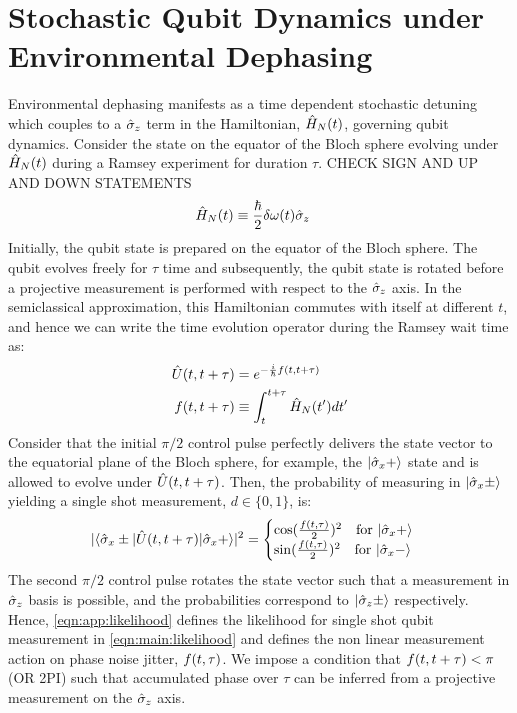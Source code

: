 \section{Stochastic Qubit Dynamics under Environmental Dephasing \label{sec:app:setup}}
Environmental dephasing manifests as a time dependent stochastic detuning which couples to a $\hat{\sigma}_{z}$ term in the Hamiltonian, $\hat{H}_{N} (t)$, governing qubit dynamics. Consider the state on the equator of the Bloch sphere evolving under $\hat{H}_{N} (t)$ during a Ramsey experiment for duration $\tau$. CHECK SIGN AND UP AND DOWN STATEMENTS
\begin{align} 
\hat{H}_{N}(t) & \equiv \frac{\hbar}{2}\delta\omega(t)\hat{\sigma}_{z}
\end{align}
Initially, the qubit state is prepared on the equator of the Bloch sphere. The qubit evolves freely for $\tau$ time and subsequently, the qubit state is rotated before a projective measurement is performed with respect to the $\hat{\sigma}_{z}$ axis. In the semiclassical approximation, this Hamiltonian commutes with itself at different $t$, and hence we can write the time evolution operator during the Ramsey wait time as:
\begin{align}
\hat{U}(t, t + \tau) & = e^{-\frac{i}{\hbar} f(t, t + \tau)} \\
f(t, t + \tau) & \equiv \int_{t}^{t + \tau} \hat{H}_{N} (t') dt' \label{eqn:app:phases}
\end{align}
Consider that the initial $\pi/2$ control pulse perfectly delivers the state vector to the equatorial plane of the Bloch sphere, for example, the  $| \hat{\sigma}_{x} + \rangle$ state and is allowed to evolve under $\hat{U}(t, t + \tau)$. Then, the probability of measuring in $| \hat{\sigma}_{x} \pm \rangle$ yielding a single shot measurement, $d \in \{0, 1\}$, is:
\begin{align} 
|\langle \hat{\sigma}_{x} \pm | \hat{U}(t, t + \tau) | \hat{\sigma}_{x} + \rangle|^2= \begin{cases} \cos(\frac{f(t, \tau)}{2})^2 \quad \text{for $ | \hat{\sigma}_{x} + \rangle$} \\   \sin(\frac{f(t, \tau)}{2})^2  \quad \text{for $ | \hat{\sigma}_{x} - \rangle$} \end{cases} \label{eqn:app:likelihood}
\end{align}
The second $\pi/2$ control pulse rotates the state vector such that a measurement in $\hat{\sigma}_{z}$ basis is possible, and the probabilities correspond to $| \hat{\sigma}_{z} \pm \rangle$ respectively. Hence, \cref{eqn:app:likelihood} defines the likelihood for single shot qubit measurement in \cref{eqn:main:likelihood} and defines the non linear measurement action on phase noise jitter, $f(t, \tau)$. 
We impose a condition that $f(t, t + \tau) < \pi$ (OR 2PI) such that accumulated phase over $\tau$ can be inferred from a projective measurement on the $\hat{\sigma}_{z}$ axis. 

